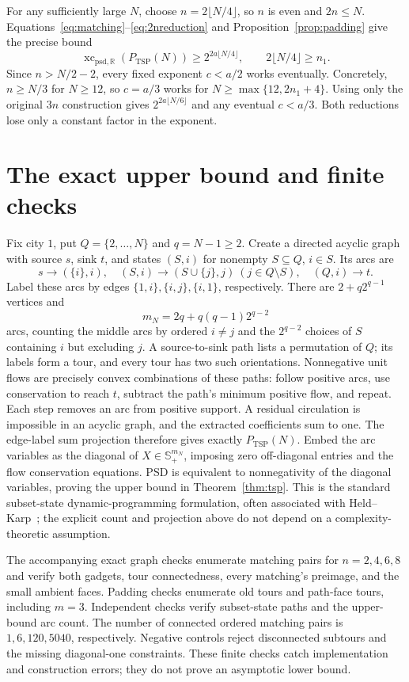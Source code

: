 \documentclass[11pt]{article}
\newcommand{\R}{\mathbb R}
\newcommand{\Splus}{\mathbb S_+}
\newcommand{\sxc}{\operatorname{xc}_{\mathrm{psd},\R}}
\newcommand{\TSP}{P_{\mathrm{TSP}}}
\begin{document}
For any sufficiently large $N$, choose $n=2\lfloor N/4\rfloor$, so $n$ is even and $2n\le N$. Equations~\eqref{eq:matching}--\eqref{eq:2nreduction} and Proposition~\ref{prop:padding} give the precise bound
\begin{equation}\label{eq:exactexponent}
 \sxc(\TSP(N))\ge2^{2a\lfloor N/4\rfloor},
 \qquad 2\lfloor N/4\rfloor\ge n_1.
\end{equation}
Since $n>N/2-2$, every fixed exponent $c<a/2$ works eventually. Concretely, $n\ge N/3$ for $N\ge12$, so $c=a/3$ works for $N\ge\max\{12,2n_1+4\}$. Using only the original $3n$ construction gives $2^{2a\lfloor N/6\rfloor}$ and any eventual $c<a/3$. Both reductions lose only a constant factor in the exponent.

\section{The exact upper bound and finite checks}
Fix city $1$, put $Q=\{2,\ldots,N\}$ and $q=N-1\ge2$. Create a directed acyclic graph with source $s$, sink $t$, and states $(S,i)$ for nonempty $S\subseteq Q$, $i\in S$. Its arcs are
\[
 s\to(\{i\},i),\quad
 (S,i)\to(S\cup\{j\},j)\ (j\in Q\setminus S),\quad
 (Q,i)\to t.
\]
Label these arcs by edges $\{1,i\},\{i,j\},\{i,1\}$, respectively. There are $2+q2^{q-1}$ vertices and
\[
 m_N=2q+q(q-1)2^{q-2}
\]
arcs, counting the middle arcs by ordered $i\ne j$ and the $2^{q-2}$ choices of $S$ containing $i$ but excluding $j$.
A source-to-sink path lists a permutation of $Q$; its labels form a tour, and every tour has two such orientations. Nonnegative unit flows are precisely convex combinations of these paths: follow positive arcs, use conservation to reach $t$, subtract the path's minimum positive flow, and repeat. Each step removes an arc from positive support. A residual circulation is impossible in an acyclic graph, and the extracted coefficients sum to one. The edge-label sum projection therefore gives exactly $\TSP(N)$.
Embed the arc variables as the diagonal of $X\in\Splus^{m_N}$, imposing zero off-diagonal entries and the flow conservation equations. PSD is equivalent to nonnegativity of the diagonal variables, proving the upper bound in Theorem~\ref{thm:tsp}. This is the standard subset-state dynamic-programming formulation, often associated with Held--Karp~\cite{heldkarp}; the explicit count and projection above do not depend on a complexity-theoretic assumption.

The accompanying exact graph checks enumerate matching pairs for $n=2,4,6,8$ and verify both gadgets, tour connectedness, every matching's preimage, and the small ambient faces. Padding checks enumerate old tours and path-face tours, including $m=3$. Independent checks verify subset-state paths and the upper-bound arc count. The number of connected ordered matching pairs is $1,6,120,5040$, respectively. Negative controls reject disconnected subtours and the missing diagonal-one constraints. These finite checks catch implementation and construction errors; they do not prove an asymptotic lower bound.
\end{document}
